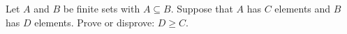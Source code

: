 Let $A$ and $B$ be finite sets with $A\subseteq B$. Suppose that $A$ has $C$ elements and $B$ has $D$ elements. Prove or disprove: $D\ge C$.
